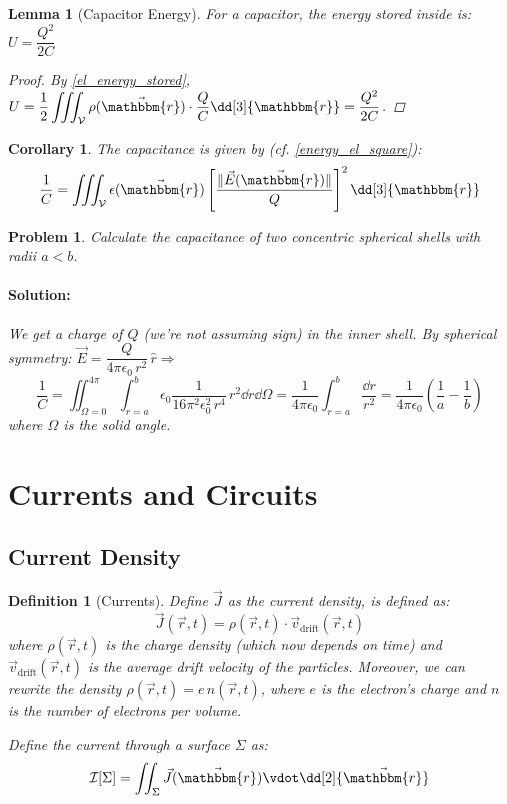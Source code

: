 \documentclass[12pt]{article}
\let\RA\Rightarrow
\newcommand*{\rv}{\vec{r}}
\newcommand*{\ir}{\mathbbm{r}}
\newcommand*{\irv}{\vec{\mathbbm{r}}}
\newcommand*{\vE}{\vec{E}}
\newcommand*{\vJ}{\vec{J}}
\newcommand*{\ee}{\epsilon_0}
\newcommand*{\vol}{\mathcal{V}}
\newcommand*{\I}{\mathcal{I}}
\newtheorem{definition}[theorem]{Definition}
\newtheorem{lemma}[theorem]{Lemma}
\newtheorem{corollary}[theorem]{Corollary}
\newtheorem{problem}[theorem]{Problem}
\newenvironment{solution}{\paragraph{Solution:}}{\hfill}
\begin{document}
\begin{lemma}[Capacitor Energy]
  For a capacitor, the energy stored inside is: $U=\dfrac{Q^2}{2C}$
  \begin{proof}
    By \ref{el_energy_stored}, $\displaystyle U=\frac{1}{2}\iiint_\vol\rho(\irv)\cdot\frac{Q}{C}\dd[3]{\ir}=\frac{Q^2}{2C}$.
  \end{proof}
\end{lemma}

\begin{corollary}
  The capacitance is given by (cf. \ref{energy_el_square}):
  $$\frac{1}{C}=\iiint_\vol \epsilon(\irv)\left[\frac{\|\vE(\irv)\|}{Q}\right]^2\dd[3]{\ir}$$
\end{corollary}

\begin{problem}
  Calculate the capacitance of two concentric spherical shells with radii $a<b$.
  \begin{solution}
    We get a charge of $Q$ (we're not assuming sign) in the inner shell. By spherical symmetry: $\vE=\dfrac{Q}{4\pi\ee\,r^2}\,\hat{r}\RA$
    $$\frac{1}{C}=\iint_{\Omega=0}^{4\pi}\int_{r=a}^b \epsilon_0\frac{1}{16\pi^2\ee^2\,r^4}\,r^2\dd{r}\dd{\Omega}=\frac{1}{4\pi\ee}\int_{r=a}^b\frac{\dd{r}}{r^2}=\frac{1}{4\pi\ee}\left(\frac{1}{a}-\frac{1}{b}\right)$$
    where $\Omega$ is the solid angle.
  \end{solution}
\end{problem}

\pagebreak

\section{Currents and Circuits}

\subsection{Current Density}

\begin{definition}[Currents]
  \label{def_current}
  Define $\vJ$ as the current density, is defined as: $$\vJ(\rv,t)=\rho(\rv,t)\cdot\vec{v}_\text{drift}(\rv,t)$$ where $\rho(\rv,t)$ is the charge density (which now depends on time) and $\vec{v}_\text{drift}(\rv,t)$ is the average drift velocity of the particles. Moreover, we can rewrite the density $\rho(\rv,t)=e\,n(\rv,t)$, where $e$ is the electron's charge and $n$ is the number of electrons per volume.

  \noindent Define the current through a surface $\Sigma$ as: $$\I[\Sigma]=\iint_\Sigma \vJ(\irv)\vdot\dd[2]{\irv}$$
\end{definition}
\end{document}
